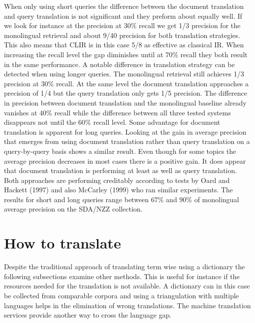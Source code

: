 \documentclass[journal]{IEEEtran}
\begin{document}
When only using short queries the difference between the document translation and query translation is not significant and they preform about equally well.
If we look for instance at the precision at 30\% recall we get 1/3 precision for the monolingual retrieval and about 9/40 precision for both translation strategies.
This also means that CLIR is in this case 5/8 as effective as classical IR.
When increasing the recall level the gap diminishes until at 70\% recall they both result in the same performance.
A notable difference in translation strategy can be detected when using longer queries.
The monolingual retrieval still achieves 1/3 precision at 30\% recall.
At the same level the document translation approaches a precision of 1/4 but the query translation only gets 1/5 precision.
The difference in precision between document translation and the monolingual baseline already vanishes at 40\% recall while the difference between all three tested systems disappears not until the 60\% recall level.
Some advantage for document translation is apparent for long queries.
Looking at the gain in average precision that emerges from using document translation rather than query translation on a query-by-query basis shows a similar result.
Even though for some topics the average precision decreases in most cases there is a positive gain.
It does appear that document translation is performing at least as well as query translation.
Both approaches are performing creditably according to tests by Oard and Hackett (1997) and also McCarley (1999) who ran similar experiments.
The results for short and long queries range between 67\% and 90\% of monolingual average precision on the SDA/NZZ collection.


\section*{How to translate}
Despite the traditional approach of translating term wise using a dictionary the following subsections examine other methods.
This is useful for instance if the resources needed for the translation is not available.
A dictionary can in this case be collected from comparable corpora and using a triangulation with multiple languages helps in the elimination of wrong translations.
The machine translation services provide another way to cross the language gap.

\setcounter{subsection}{0}
\end{document}
